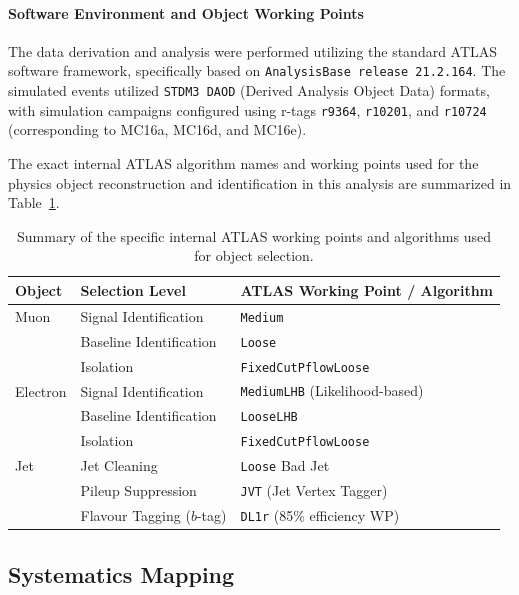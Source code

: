 \paragraph{Software Environment and Object Working Points}
The data derivation and analysis were performed utilizing the standard ATLAS software framework, specifically based on \texttt{AnalysisBase release 21.2.164}. The simulated events utilized \texttt{STDM3 DAOD} (Derived Analysis Object Data) formats, with simulation campaigns configured using r-tags \texttt{r9364}, \texttt{r10201}, and \texttt{r10724} (corresponding to MC16a, MC16d, and MC16e).

The exact internal ATLAS algorithm names and working points used for the physics object reconstruction and identification in this analysis are summarized in Table~\ref{tab:object_wp_app}.

\begin{table}[htbp]
\centering
\begin{tabular}{lll}
\toprule
\textbf{Object} & \textbf{Selection Level} & \textbf{ATLAS Working Point / Algorithm} \\
\midrule
Muon     & Signal Identification   & \texttt{Medium} \\
         & Baseline Identification & \texttt{Loose} \\
         & Isolation               & \texttt{FixedCutPflowLoose} \\
\addlinespace
Electron & Signal Identification   & \texttt{MediumLHB} (Likelihood-based) \\
         & Baseline Identification & \texttt{LooseLHB} \\
         & Isolation               & \texttt{FixedCutPflowLoose} \\
\addlinespace
Jet      & Jet Cleaning            & \texttt{Loose} Bad Jet \\
         & Pileup Suppression      & \texttt{JVT} (Jet Vertex Tagger) \\
         & Flavour Tagging ($b$-tag) & \texttt{DL1r} (85\% efficiency WP) \\
\bottomrule
\end{tabular}
\caption{\rm Summary of the specific internal ATLAS working points and algorithms used for object selection.}
\label{tab:object_wp_app}
\end{table}







\subsection{Systematics Mapping}
\label{subsec:app_syst}

